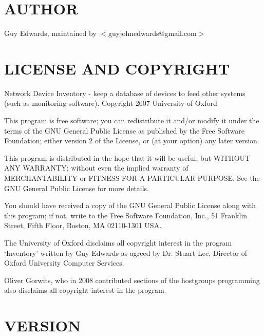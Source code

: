 \documentclass{book}
\begin{document}
\section{AUTHOR}
\label{_AUTHOR}
\hypertarget{_AUTHOR}{}



Guy Edwards, maintained by $<$guyjohnedwards@gmail.com$>$


\section{LICENSE AND COPYRIGHT}
\label{_LICENSE_AND_COPYRIGHT}
\hypertarget{_LICENSE_AND_COPYRIGHT}{}



Network Device Inventory - keep a database of devices to feed other systems (such as monitoring software). Copyright 2007 University of Oxford



This program is free software; you can redistribute it and/or modify it under the terms of the GNU General Public License as published by the Free Software Foundation; either version 2 of the License, or (at your option) any later version.



This program is distributed in the hope that it will be useful, but WITHOUT ANY WARRANTY; without even the implied warranty of MERCHANTABILITY or FITNESS FOR A PARTICULAR PURPOSE. See the GNU General Public License for more details.



You should have received a copy of the GNU General Public License along with this program; if not, write to the Free Software Foundation, Inc., 51 Franklin Street, Fifth Floor, Boston, MA 02110-1301 USA.



The University of Oxford disclaims all copyright interest in the program `Inventory' written by Guy Edwards as agreed by Dr. Stuart Lee, Director of Oxford University Computer Services.



Oliver Gorwits, who in 2008 contributed sections of the hostgroups programming also disclaims all copyright interest in the program.




\section{VERSION}
\label{_VERSION}
\hypertarget{_VERSION}{}
\end{document}
